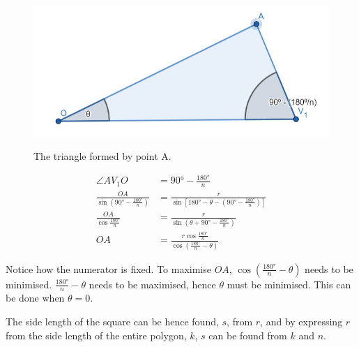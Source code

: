 \documentclass[12pt]{scrartcl}
\begin{document}
\begin{figure}[htpb]
	\centering
	\includegraphics[scale=.75]{images/rq2_1_2.jpg}
	\label{fig:rq2_1_2_img}
	\caption{The triangle formed by point A.}
\end{figure}

\begin{align*}
	\angle AV_{1}O                                              & = \ang{90} - \frac{\ang{180}}{n}                                                               \\
	\frac{OA}{\sin \left(\ang{90} - \frac{\ang{180}}{n}\right)} & = \frac{r}{\sin \left[\ang{180} - \theta - \left(\ang{90} - \frac{\ang{180}}{n}\right)\right]} \\
	\frac{OA}{\cos \frac{\ang{180}}{n}}                         & = \frac{r}{\sin \left(\theta + \ang{90} - \frac{\ang{180}}{n}\right)}                          \\
	OA                                                          & = \frac{r \cos \frac{\ang{180}}{n}}{\cos \left(\frac{\ang{180}}{n} - \theta\right)}
\end{align*}

Notice how the numerator is fixed. To maximise $OA$, $\cos \left(\frac{\ang{180}}{n} - \theta\right)$ needs to be minimised. $\frac{\ang{180}}{n} - \theta$ needs to be maximised, hence $\theta$ must be minimised. This can be done when $\theta = 0$.

The side length of the square can be hence found, $s$, from $r$, and by expressing $r$ from the side length of the entire polygon, $k$, $s$ can be found from $k$ and $n$.
\end{document}
